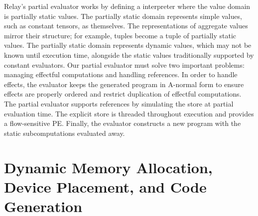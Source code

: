 Relay's partial evaluator works by defining a interpreter
  where the value domain is partially static values.
The partially static domain represents simple values,
  such as constant tensors, as themselves.
The representations
  of aggregate values mirror their structure; for example,
  tuples become a tuple of partially static values.
The partially static domain represents dynamic values,
  which may not be known until execution time,
  alongside the static values traditionally supported by
  constant evaluators.
Our partial evaluator must solve two important problems:
  managing effectful computations and handling references.
In order to handle effects, the evaluator keeps the generated
  program in A-normal form to ensure effects are properly ordered
  and restrict duplication of effectful computations.
The partial evaluator supports references by
  simulating the store at partial evaluation time.
The explicit store is threaded throughout execution
  and provides a flow-sensitive PE.
Finally, the evaluator constructs a new program with
  the static subcomputations evaluated away.


\section{Dynamic Memory Allocation, Device Placement, and Code Generation}


